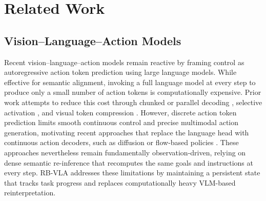 \documentclass[conference]{IEEEtran}
\begin{document}
\begin{enumerate}
\end{enumerate}

\section{Related Work}
\subsection{Vision--Language--Action Models}
Recent vision–language–action models \cite{kim2024openvla,brohan2022rt} remain reactive by framing control as autoregressive action token prediction using large language models. While effective for semantic alignment, invoking a full language model at every step to produce only a small number of action tokens is computationally expensive. 
Prior work attempts to reduce this cost through chunked or parallel decoding \cite{kim2025fine,song2025accelerating}, selective activation \cite{yang2025efficientvla}, and visual token compression \cite{vasu2025fastvlm}. However, discrete action token prediction limits smooth continuous control and precise multimodal action generation, motivating recent approaches that replace the language head with continuous action decoders, such as diffusion \cite{bjorck2025gr00t} or flow-based policies \cite{black2025pi_}. These approaches nevertheless remain fundamentally observation-driven, 
relying on dense semantic re-inference that recomputes the same goals and instructions at every step. 
RB-VLA addresses these limitations by maintaining a persistent state that tracks task progress and replaces computationally heavy VLM-based reinterpretation.
\end{document}
